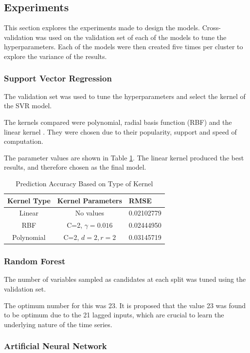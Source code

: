 \subsection{Experiments}

This section explores the experiments made to design the models. Cross-validation was used on the validation set of each of the models to tune the hyperparameters. Each of the models were then created five times per cluster to explore the variance of the results.

\subsubsection{Support Vector Regression}

The validation set was used to tune the hyperparameters and select the kernel of the SVR model.

The kernels compared were polynomial, radial basis function (RBF) and the linear kernel \cite{Chang2010, theodoridis2009pattern}. They were chosen due to their popularity, support and speed of computation.

The parameter values are shown in Table \ref{tab:kernel}. The linear kernel produced the best results, and therefore chosen as the final model.
\begin{table}
	\caption{Prediction Accuracy Based on Type of Kernel}
	\label{tab:kernel}
	\begin{tabular}{ccl}
		\toprule
		Kernel Type& Kernel Parameters & RMSE\\
		\midrule
		Linear & No values & 0.02102779\\
		RBF & C=2, $\gamma=0.016$ & 0.02444950\\
		Polynomial & C=2, $d=2, r=2$ & 0.03145719 \\
		\bottomrule
	\end{tabular}
\end{table}
\subsubsection{Random Forest}
The number of variables sampled as candidates at each split was tuned using the validation set.

The optimum number for this was 23. It is proposed that the value 23 was found to be optimum due to the 21 lagged inputs, which are crucial to learn the underlying nature of the time series.


\subsubsection{Artificial Neural Network}

